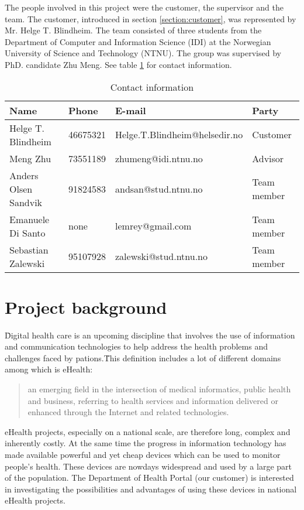The people involved in this project were the customer, the supervisor and the team.
The customer, introduced in section \ref{section:customer}, was represented by Mr. Helge T. Blindheim.
The team consisted of three students from the Department of Computer and Information Science (IDI) at the Norwegian University of Science and Technology (NTNU). The group was supervised by PhD. candidate Zhu Meng.
See table \ref{table:contact} for contact information.

\begin{table}[h]
\begin{center}
\begin{tabular}{ | l | l | l | p{2.5cm} | }
  \hline
  Name & Phone & E-mail & Party \\
  \hline\noalign{\smallskip}\hline
  Helge T. Blindheim	& 46675321		& Helge.T.Blindheim@helsedir.no		& Customer\\
  Meng Zhu				& 73551189		& zhumeng@idi.ntnu.no				& Advisor\\
  Anders Olsen Sandvik	& 91824583		& andsan@stud.ntnu.no				& Team member \\
  Emanuele Di Santo		& none			& lemrey@gmail.com					& Team member \\
  Sebastian Zalewski	& 95107928		& zalewski@stud.ntnu.no				& Team member \\
  \hline
\end{tabular}
\end{center}
\caption{Contact information}
\label{table:contact}
\end{table}

\section{Project background}
\label{section:background}

\"Digital health care is an upcoming discipline that involves the use of information and communication technologies to help address the health problems and challenges faced by pations.\" 
This definition includes a lot of different domains among which is eHealth:
\begin{quote}
an emerging field in the intersection of medical informatics, public health and business, referring to health services
and information delivered or enhanced through the Internet and related technologies.\citep{ehealth}
\end{quote}
eHealth projects, especially on a national scale, are therefore long, complex and inherently costly.
At the same time the progress in information technology has made available powerful and yet cheap devices which
can be used to monitor people's health. These devices are nowdays widespread and used by a large part of the
population. The Department of Health Portal (our customer) is interested in investigating the
possibilities and advantages of using these devices in national eHealth projects.

